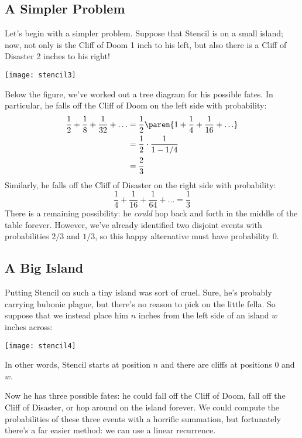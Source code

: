 \subsection{A Simpler Problem}

Let's begin with a simpler problem.  Suppose that Stencil is on a
small island; now, not only is the Cliff of Doom 1 inch to his left,
but also there is a Cliff of Disaster 2 inches to his right!
%
\begin{center}
\texttt{[image: stencil3]}
\end{center}
%
Below the figure, we've worked out a tree diagram for his possible
fates.  In particular, he falls off the Cliff of Doom on the left side
with probability:
%
\begin{align*}
\frac{1}{2} + \frac{1}{8} + \frac{1}{32} + \ldots
    & = \frac{1}{2} \paren{1 + \frac{1}{4} + \frac{1}{16} + \ldots} \\
    & = \frac{1}{2} \cdot \frac{1}{1 - 1/4} \\
    & = \frac{2}{3}
\end{align*}
%
Similarly, he falls off the Cliff of Disaster on the right side with
probability:
%
\[
\frac{1}{4} + \frac{1}{16} + \frac{1}{64} + \ldots = \frac{1}{3}
\]
%
There is a remaining possibility: he \textit{could} hop back and forth
in the middle of the table forever.  However, we've already identified
two disjoint events with probabilities $2/3$ and $1/3$, so this happy
alternative must have probability 0.

\subsection{A Big Island}

Putting Stencil on such a tiny island was sort of cruel.  Sure, he's
probably carrying bubonic plague, but there's no reason to pick on the
little fella.  So suppose that we instead place him $n$ inches from
the left side of an island $w$ inches across:
%
\begin{center}
\texttt{[image: stencil4]}
\end{center}
%
In other words, Stencil starts at position $n$ and there are cliffs at
positions 0 and $w$.

Now he has three possible fates: he could fall off the Cliff of Doom,
fall off the Cliff of Disaster, or hop around on the island forever.
We could compute the probabilities of these three events with a
horrific summation, but fortunately there's a far easier method: we
can use a linear recurrence.


